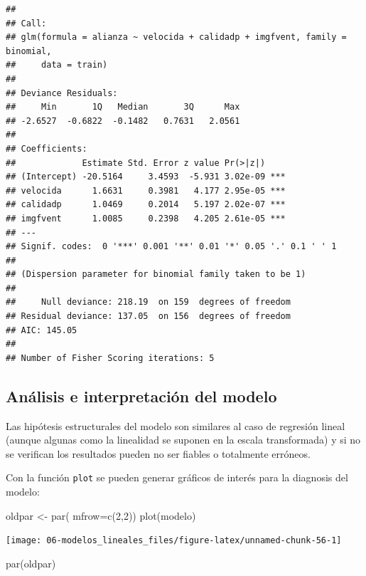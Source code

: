 \documentclass[
]{book}
\newenvironment{Shaded}{\begin{snugshade}}{\end{snugshade}}
\newcommand{\AttributeTok}[1]{\textcolor[rgb]{0.77,0.63,0.00}{#1}}
\newcommand{\DecValTok}[1]{\textcolor[rgb]{0.00,0.00,0.81}{#1}}
\newcommand{\FunctionTok}[1]{\textcolor[rgb]{0.00,0.00,0.00}{#1}}
\newcommand{\NormalTok}[1]{#1}
\newcommand{\OtherTok}[1]{\textcolor[rgb]{0.56,0.35,0.01}{#1}}
\theoremstyle{break}
\theoremstyle{definition}
\theoremstyle{definition}
\theoremstyle{definition}
\theoremstyle{definition}
\theoremstyle{remark}
\begin{document}
\begin{verbatim}
## 
## Call:
## glm(formula = alianza ~ velocida + calidadp + imgfvent, family = binomial, 
##     data = train)
## 
## Deviance Residuals: 
##     Min       1Q   Median       3Q      Max  
## -2.6527  -0.6822  -0.1482   0.7631   2.0561  
## 
## Coefficients:
##             Estimate Std. Error z value Pr(>|z|)    
## (Intercept) -20.5164     3.4593  -5.931 3.02e-09 ***
## velocida      1.6631     0.3981   4.177 2.95e-05 ***
## calidadp      1.0469     0.2014   5.197 2.02e-07 ***
## imgfvent      1.0085     0.2398   4.205 2.61e-05 ***
## ---
## Signif. codes:  0 '***' 0.001 '**' 0.01 '*' 0.05 '.' 0.1 ' ' 1
## 
## (Dispersion parameter for binomial family taken to be 1)
## 
##     Null deviance: 218.19  on 159  degrees of freedom
## Residual deviance: 137.05  on 156  degrees of freedom
## AIC: 145.05
## 
## Number of Fisher Scoring iterations: 5
\end{verbatim}

\hypertarget{analisis-glm}{%
\subsection{Análisis e interpretación del modelo}\label{analisis-glm}}

Las hipótesis estructurales del modelo son similares al caso de regresión lineal (aunque algunas como la linealidad se suponen en la escala transformada) y si no se verifican los resultados pueden no ser fiables o totalmente erróneos.

Con la función \texttt{plot} se pueden generar gráficos de interés para la diagnosis del modelo:

\begin{Shaded}
\begin{Highlighting}[]
\NormalTok{oldpar }\OtherTok{\textless{}{-}} \FunctionTok{par}\NormalTok{( }\AttributeTok{mfrow=}\FunctionTok{c}\NormalTok{(}\DecValTok{2}\NormalTok{,}\DecValTok{2}\NormalTok{))}
\FunctionTok{plot}\NormalTok{(modelo)}
\end{Highlighting}
\end{Shaded}

\begin{center}\texttt{[image: 06-modelos\_lineales\_files/figure-latex/unnamed-chunk-56-1]} \end{center}

\begin{Shaded}
\begin{Highlighting}[]
\FunctionTok{par}\NormalTok{(oldpar)}
\end{Highlighting}
\end{Shaded}
\end{document}
